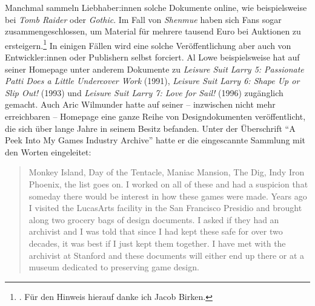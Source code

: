 \documentclass[a5paper,pagesize,numbers=noenddot]{scrbook}
\begin{document}
Manchmal sammeln Liebhaber:innen solche Dokumente online, wie beispielsweise bei \textit{Tomb Raider} oder \textit{Gothic}.\autocite[Vgl.][]{core_design_tomb_raider,gothic_archive_2024}
Im Fall von \textit{Shenmue} haben sich Fans sogar zusammengeschlossen, um Material für mehrere tausend Euro bei Auktionen zu ersteigern.\footnote{\autocite[Vgl.][]{shenmue_original_2025}.
Für den Hinweis hierauf danke ich Jacob Birken.}
In einigen Fällen wird eine solche Veröffentlichung aber auch von Entwickler:innen oder Publishern selbst forciert.
Al Lowe beispielsweise hat auf seiner Homepage unter anderem Dokumente zu \textit{Leisure Suit Larry 5: Passionate Patti Does a Little Undercover Work} (1991), \textit{Leisure Suit Larry 6: Shape Up or Slip Out!} (1993) und \textit{Leisure Suit Larry 7: Love for Sail!} (1996) zugänglich gemacht.\autocite[Vgl.][]{lowe_designs_2025}
Auch Aric Wilmunder hatte auf seiner -- inzwischen nicht mehr erreichbaren -- Homepage eine ganze Reihe von Designdokumenten veröffentlicht, die sich über lange Jahre in seinem Besitz befanden.
Unter der Überschrift \enquote{A Peek Into My Games Industry Archive} hatte er die eingescannte Sammlung mit den Worten eingeleitet:

\begin{quote}
   Monkey Island, Day of the Tentacle, Maniac Mansion, The Dig, Indy Iron Phoenix, the list goes on.
   I worked on all of these and had a suspicion that someday there would be interest in how these games were made.
   Years ago I visited the LucasArts facility in the San Francisco Presidio and brought along two grocery bags of design documents.
   I asked if they had an archivist and I was told that since I had kept these safe for over two decades, it was best if I just kept them together.
   I have met with the archivist at Stanford and these documents will either end up there or at a museum dedicated to preserving game design.\autocite{wilmunder_peek}
\end{quote}
\end{document}
